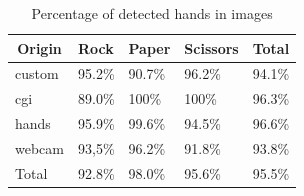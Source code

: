 \documentclass[a4paper]{article}
\begin{document}
\begin{table}[H]
\caption{Percentage of detected hands in images}
\centering
\label{tbl:img-hands_percentage}
\begin{tabular}{@{}lllll@{}}
\toprule
\multicolumn{1}{c}{Origin} & Rock   & Paper  & Scissors & Total  \\ \midrule
custom                     & 95.2\% & 90.7\% & 96.2\%   & 94.1\% \\
cgi                        & 89.0\% & 100\%  & 100\%    & 96.3\% \\
hands                      & 95.9\% & 99.6\% & 94.5\%   & 96.6\% \\
webcam                     & 93,5\% & 96.2\% & 91.8\%   & 93.8\% \\
Total                      & 92.8\% & 98.0\% & 95.6\%   & 95.5\% \\ \bottomrule
\end{tabular}
\end{table}
\end{document}
